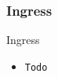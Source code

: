 
\subsubsection{Ingress}
\begin{frame}[fragile]{Ingress}
  \begin{itemize}
    \item \texttt{Todo}
  \end{itemize}
  \begin{lstlisting}
  \end{lstlisting}
\end{frame}
